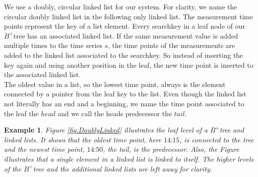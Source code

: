 \documentclass[abstracton,12pt,oneside]{scrreprt}
\newtheorem{example}{Example}
\begin{document}
We use a doubly, circular linked list for our system. For clarity, we name the circular doubly linked list in the following only linked list. The measurement time points represent the key of a list element. Every searchkey in a leaf node of our $B^+$tree has an associated linked list. If the same measurement value is added multiple times to the time series $s$, the time points of the measurements are added to the linked list associated to the searchkey. So instead of inserting the key again and using another position in the leaf, the new time point is inserted to the associated linked list.\\ 
The oldest value in a list, so the lowest time point, always is the element connected by a pointer from the leaf key to the list. Even though the linked list not literally has an end and a beginning, we name the time point associated to the leaf the $head$ and we call the heads predecessor the $tail$. 
\begin{example}
Figure \ref{fig:DoublyLinked} illustrates the leaf level of a $B^+$tree and linked lists. It shows that the oldest time point, here $\text{14:15}$, is connected to the tree and the newest time point, $\text{14:50}$, the tail, is the predecessor. Also, the Figure illustrates that a single element in a linked list is linked to itself. The higher levels of the $B^+$tree and the additional linked lists are left away for clarity. 
\end{example}
\end{document}
